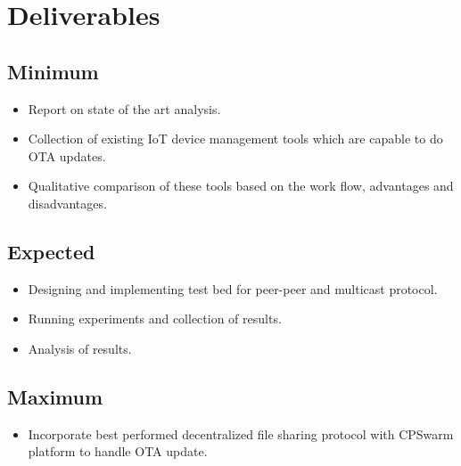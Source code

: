 \documentclass[12pt]{article}
\begin{document}
\newpage
\section{Deliverables}
\subsection{Minimum}
\begin{itemize}
\item Report on state of the art analysis.
\item Collection of existing IoT device management tools which are capable to do OTA updates.
\item Qualitative comparison of these tools based on the work flow, advantages and disadvantages.
\end{itemize}
\subsection{Expected}
\begin{itemize}
\item Designing and implementing test bed for peer-peer and multicast protocol.
\item Running experiments and collection of results.
\item Analysis of results.
\end{itemize}
\subsection{Maximum}
\begin{itemize}
\item Incorporate best performed decentralized file sharing protocol with CPSwarm platform to handle OTA update.
\end{itemize}




\newpage
\end{document}
